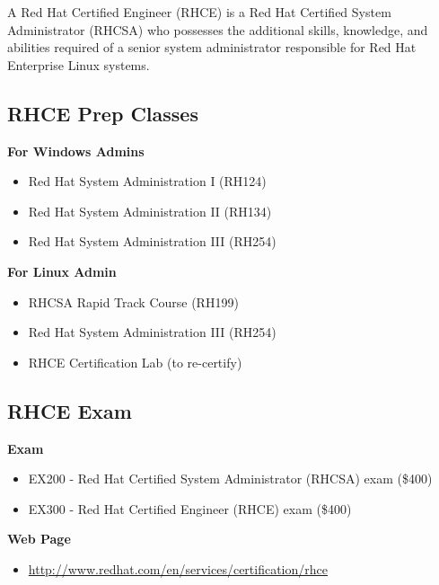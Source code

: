 \documentclass[letterpaper,10pt,english]{sphinxmanual}
\begin{document}
A Red Hat Certified Engineer (RHCE) is a Red Hat Certified System Administrator (RHCSA) who possesses the additional skills, knowledge, and abilities required of a senior system administrator responsible for Red Hat Enterprise Linux systems.


\subsection{RHCE Prep Classes}
\label{intro:rhce-prep-classes}
\textbf{For Windows Admins}
\begin{itemize}
\item {} 
Red Hat System Administration I (RH124)

\item {} 
Red Hat System Administration II (RH134)

\item {} 
Red Hat System Administration III (RH254)

\end{itemize}

\textbf{For Linux Admin}
\begin{itemize}
\item {} 
RHCSA Rapid Track Course (RH199)

\item {} 
Red Hat System Administration III (RH254)

\item {} 
RHCE Certification Lab (to re-certify)

\end{itemize}


\subsection{RHCE Exam}
\label{intro:rhce-exam}
\textbf{Exam}
\begin{itemize}
\item {} 
EX200 - Red Hat Certified System Administrator (RHCSA) exam (\$400)

\item {} 
EX300 - Red Hat Certified Engineer (RHCE) exam (\$400)

\end{itemize}

\textbf{Web Page}
\begin{itemize}
\item {} 
\href{http://www.redhat.com/en/services/certification/rhce}{http://www.redhat.com/en/services/certification/rhce}

\end{itemize}
\end{document}
